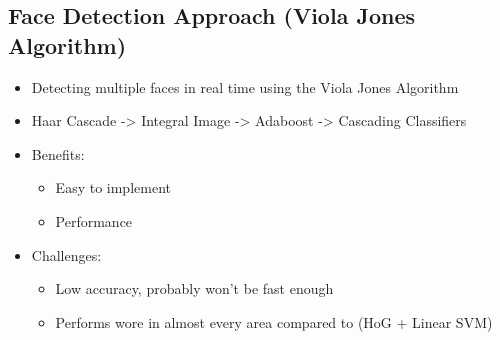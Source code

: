 \subsection{Face Detection Approach (Viola Jones Algorithm)}
\begin{itemize}
    \item Detecting multiple faces in real time using the Viola Jones Algorithm
    \item Haar Cascade -> Integral Image -> Adaboost -> Cascading Classifiers
    \item Benefits:
            \begin{itemize}
        \item Easy to implement
        \item Performance
                \end{itemize}
    \item Challenges:
            \begin{itemize}
        \item Low accuracy, probably won’t be fast enough
        \item Performs wore in almost every area compared to (HoG + Linear SVM)
                \end{itemize}
\end{itemize}